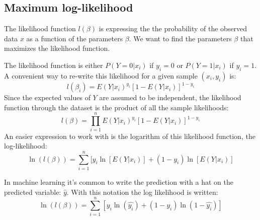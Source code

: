 	\subsection{Maximum log-likelihood \cite{hosmer2004applied}}

		The likelihood function $l(\beta)$ is expressing the the probability of the observed data $x$ as a function of the parameters $\beta$. We want to find the parameters $\beta$ that maximizes the likelihood function.

		The likelihood function is either $P(Y=0|x_i)$ if $y_i=0$ or $P(Y=1|x_i)$ if $y_i=1$. A convenient way to re-write this likelihood for a given sample $(x_i,y_i)$ is:
		$$ l(\beta_i) = E(Y|x_i)^{y_i} [ 1 - E(Y|x_i) ]^{1-y_i} $$
		Since the expected values of $Y$ are assumed to be independent, the likelihood function through the dataset is the product of all the sample likelihoods:
		$$ l(\beta) = \prod_{i=1}^n E(Y|x_i)^{y_i} [ 1 - E(Y|x_i) ]^{1-y_i} $$
		An easier expression to work with is the logarithm of this likelihood function, the log-likelihood: 
		$$ \ln(l(\beta)) = \sum_{i=1}^n [y_i\ln[E(Y|x_i)] + (1-y_i)\ln[E(Y|x_i) ] $$

		In machine learning it's common to write the prediction with a hat on the predicted variable: $\hat{y}$. With this notation the log likelihood is written: 
		$$ \ln(l(\beta)) = \sum_{i=1}^n [ y_i \ln(\hat{y_i})+ (1-y_i)\ln(1-\hat{y_i})] $$

